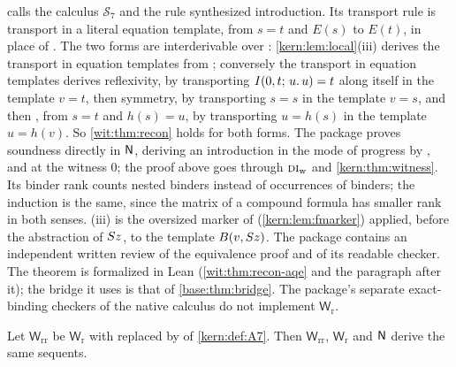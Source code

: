 \begin{remark}
\label{wit:rem:recon-package}
 calls the calculus $\mathcal S_7$ and the
rule synthesized introduction.  Its transport rule is transport in a literal
equation template, from $s=t$ and $E(s)$ to $E(t)$, in place of
.  The two forms are interderivable over :
\cref{kern:lem:local}(iii) derives the transport in equation templates from
; conversely the transport in equation templates derives
reflexivity, by transporting $I(0,t;\,u.\,u)=t$ along itself in the template
$v=t$, then symmetry, by transporting $s=s$ in the template $v=s$, and then
, from $s=t$ and $h(s)=u$, by transporting $u=h(s)$ in the
template $u=h(v)$.  So \cref{wit:thm:recon} holds for both forms.  The package
proves soundness directly in $\mathsf{N}$, deriving an introduction in the mode of
progress by ,  and  at the witness $0$;
the proof above goes through $\rulename{DI}_{\mathrm{w}}$ and
\cref{kern:thm:witness}.  Its binder rank counts nested binders instead of
occurrences of binders; the induction is the same, since the matrix of a
compound formula has smaller rank in both senses.
(iii) is the oversized marker of
 (\cref{kern:lem:fmarker}) applied, before
the abstraction of $S z$, to the template $B(v,S z)$.  The package
contains an independent written review of the equivalence proof and of its
readable checker.  The theorem is formalized in Lean
(\cref{wit:thm:recon-aqe} and the paragraph after it); the bridge it uses is
that of \cref{base:thm:bridge}.  The
package's
separate exact-binding checkers of the native calculus do not implement
$\mathsf{W}_{\mathrm r}$.
\end{remark}

\begin{theorem}
\label{wit:thm:recon-aqe}
Let $\mathsf{W}_{\mathrm{rr}}$ be $\mathsf{W}_{\mathrm r}$ with 
replaced by  of \cref{kern:def:A7}.  Then
$\mathsf{W}_{\mathrm{rr}}$, $\mathsf{W}_{\mathrm r}$ and $\mathsf{N}$ derive the same
sequents.
\end{theorem}

